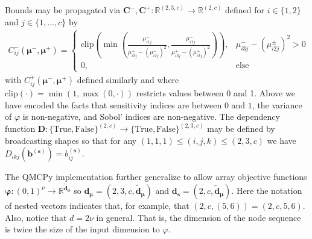 \documentclass[graybox]{svmult}
\begin{document}
Bounds may be propagated via $\boldsymbol{C}^-,\boldsymbol{C}^+:\mathbb{R}^{(2, 3, c)} \to \mathbb{R}^{(2, c)}$ defined for $i \in \{1,2\}$ and $j \in \{1,\dots,c\}$  by  
\begin{align*}
    C_{ij}^-(\boldsymbol{\mu}^-,\boldsymbol{\mu}^+) 
    = \begin{cases} 
        \text{clip}\left(\min\left(\frac{\mu_{i1j}^-}{\mu_{i3j}^+-\left(\mu_{i2j}^-\right)^2},\frac{\mu_{i1j}^-}{\mu_{i3j}^+-\left(\mu_{i2j}^+\right)^2}\right)\right), & \mu_{i3j}^- - \left(\mu_{i2j}^\pm\right)^2 >0 \\
        0, &\text{else}
     \end{cases} %
\end{align*}
with $C^+_{ij}(\boldsymbol{\mu}^-,\boldsymbol{\mu}^+)$ defined similarly and where $\text{clip}(\cdot) = \min(1,\max(0,\cdot))$ restricts values between 0 and 1. Above we have encoded the facts that sensitivity indices are between $0$ and $1$, the variance of $\varphi$ is non-negative, and Sobol' indices are non-negative. The dependency function $\boldsymbol{D}:\{\text{True},\text{False}\}^{(2, c)} \to \{\text{True},\text{False}\}^{(2, 3, c)}$ may be defined by broadcasting shapes so that for any $(1,1,1) \leq (i,j,k) \leq (2,3,c)$ we have $D_{ikj}(\boldsymbol{b}^{(\boldsymbol{s})}) = b_{ij}^{(\boldsymbol{s})}$. 

The QMCPy implementation further generalize to allow array objective functions $\boldsymbol{\varphi}: (0,1)^\nu \to \mathbb{R}^{\tilde{\boldsymbol{d}}_{\boldsymbol{\mu}}}$ so $\boldsymbol{d}_{\boldsymbol{\mu}} = (2,3,c,\tilde{\boldsymbol{d}}_{\boldsymbol{\mu}})$ and $\boldsymbol{d}_{\boldsymbol{s}} = (2,c,\tilde{\boldsymbol{d}}_{\boldsymbol{\mu}})$. Here the notation of nested vectors indicates that, for example, that  $(2,c,(5,6)) =(2,c,5,6)$. Also, notice that $d = 2 \nu$ in general. That is, the dimension of the node sequence is twice the size of the input dimension to $\varphi$.
\end{document}
